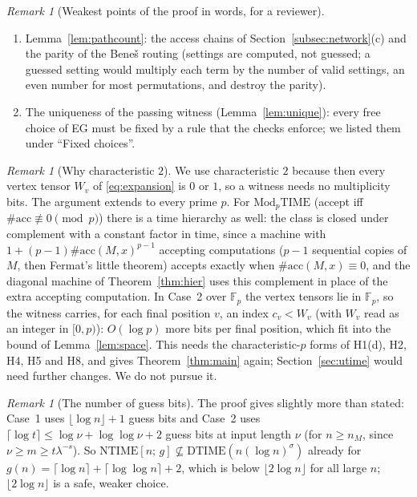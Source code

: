 \documentclass[11pt]{article}
\theoremstyle{definition}
\theoremstyle{remark}
\newtheorem{remark}[theorem]{Remark}
\newcommand{\F}{\mathbb F}
\newcommand{\DTIME}{\mathrm{DTIME}}
\newcommand{\NTIME}{\mathrm{NTIME}}
\newcommand{\acc}{\#\mathrm{acc}}
\newcommand{\src}[1]{\url{#1}}
\begin{document}
\begin{remark}[Weakest points of the proof in words, for a reviewer]
\begin{enumerate}
  A proof against the Lean construction would use those keys and weights in C7--C10;
  this changes no radius of Lemma~\ref{lem:locality}. An independent reading of OpenAI's executed Lean construction (commit
  \texttt{3344da5}), datum by datum, found that H9--H11 hold as used here, with the same radii and the same uniqueness argument; the
  only differences are these keys and weights (\src{CHECKS.md}, row 28).
\item Lemma~\ref{lem:pathcount}: the access chains of Section~\ref{subsec:network}(c) and the parity of the Bene\v{s} routing
  (settings are computed, not guessed; a guessed setting would multiply each term by the number of valid settings, an even number
  for most permutations, and destroy the parity).
\item The uniqueness of the passing witness (Lemma~\ref{lem:unique}): every free choice of EG must be fixed by a rule that the
  checks enforce; we listed them under ``Fixed choices''.
\end{enumerate}
\end{remark}

\begin{remark}[Why characteristic $2$]
We use characteristic $2$ because then every vertex tensor $W_v$ of \eqref{eq:expansion} is $0$ or $1$, so a witness needs no
multiplicity bits. The argument extends to every prime $p$. For $\mathrm{Mod}_p\mathrm{TIME}$ (accept iff
$\acc\not\equiv0\pmod p$) there is a time hierarchy as well: the class is closed under complement with a constant factor in time,
since a machine with $1+(p-1)\acc(M,x)^{p-1}$ accepting computations ($p-1$ sequential copies of $M$, then Fermat's little
theorem) accepts exactly when $\acc(M,x)\equiv0$, and the diagonal machine of Theorem~\ref{thm:hier} uses this complement in place
of the extra accepting computation. In Case~2 over $\F_p$ the vertex tensors lie in $\F_p$, so the witness carries, for each final
position $v$, an index $c_v<W_v$ (with $W_v$ read as an integer in $[0,p)$): $O(\log p)$ more bits per final position, which fit
into the bound of Lemma~\ref{lem:space}. This needs the characteristic-$p$ forms of H1(d), H2, H4, H5 and H8, and gives
Theorem~\ref{thm:main} again; Section~\ref{sec:utime} would need further changes. We do not pursue it.
\end{remark}

\begin{remark}[The number of guess bits]
The proof gives slightly more than stated: Case~1 uses $\lfloor\log n\rfloor+1$ guess bits and Case~2 uses
$\lceil\log t\rceil\le\log\nu+\log\log\nu+2$ guess bits at input length $\nu$ (for $n\ge n_M$, since
$\nu\ge m\ge t\lambda^{-s}$). So $\NTIME[n;\,g]\not\subseteq\DTIME(n(\log n)^{\sigma})$ already for
$g(n)=\lceil\log n\rceil+\lceil\log\log n\rceil+2$, which is below $\lfloor2\log n\rfloor$ for all large $n$; $\lfloor2\log n\rfloor$ is a
safe, weaker choice.
\end{remark}
\end{document}
